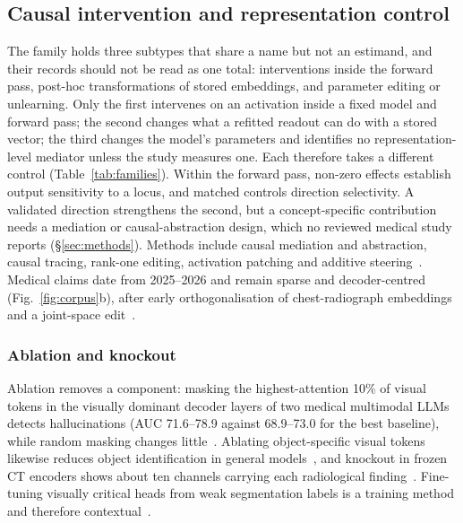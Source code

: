 \subsection{Causal intervention and representation control}
\label{sec:intervention}

The family holds three subtypes that share a name but not an estimand, and their records should not be
read as one total: interventions inside the forward pass, post-hoc transformations of stored embeddings,
and parameter editing or unlearning. Only the first intervenes on an activation inside a fixed model and forward pass; the second changes
what a refitted readout can do with a stored vector; the third changes the model's parameters and
identifies no representation-level mediator unless the study measures one. Each therefore takes a different control
(Table~\ref{tab:families}). Within the forward pass, non-zero effects establish output sensitivity to a
locus, and matched controls direction selectivity. A validated direction strengthens the second, but a
concept-specific contribution needs a mediation or causal-abstraction design, which no reviewed medical
study reports (\S\ref{sec:methods}). Methods include causal mediation and
abstraction, causal tracing, rank-one editing, activation patching and additive
steering~\cite{vig2020causal,geiger2021causal,geiger2023causal,meng2022locating,meng2022mass,zhang2023towards,turner2023steering,rimsky2023steering,zou2023representation,li2023inference,arditi2024refusal}.
Medical claims date from 2025--2026 and remain sparse and decoder-centred (Fig.~\ref{fig:corpus}b),
after early orthogonalisation of chest-radiograph embeddings~\cite{weber2023posthoc} and a
joint-space edit~\cite{sadashivaiah2024explaining}.

\subsubsection{Ablation and knockout}

Ablation removes a component: masking the highest-attention 10\% of visual tokens in the visually
dominant decoder layers of two medical multimodal LLMs detects hallucinations (AUC 71.6--78.9
against 68.9--73.0 for the best baseline), while random masking changes little~\cite{chen2026vihd}.
Ablating object-specific visual tokens likewise reduces object identification in general
models~\cite{neo2024towards}, and knockout in frozen CT encoders shows about ten channels carrying
each radiological finding~\cite{nooralahzadeh2026sparse}. Fine-tuning visually critical heads from
weak segmentation labels is a training method and therefore contextual~\cite{chang2025focus}.

